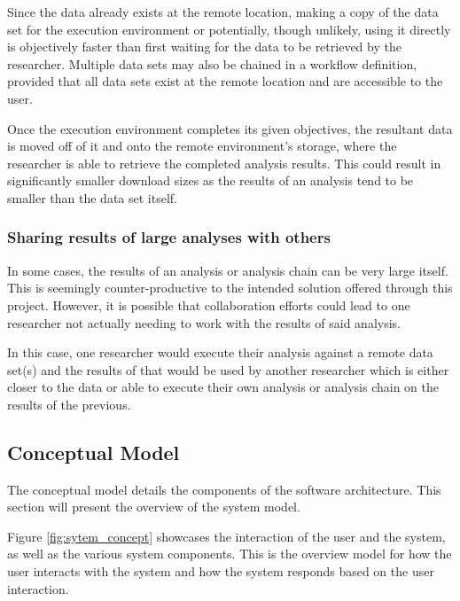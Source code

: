 Since the data already exists at the remote location, making a copy of the data set for the execution environment  or potentially, though unlikely, using it directly is objectively faster than first waiting for the data to be retrieved by the researcher. Multiple data sets may also be chained in a workflow definition, provided that all data sets exist at the remote location and are accessible to the user.

Once the execution environment completes its given objectives, the resultant data is moved off of it and onto the remote environment's storage, where the researcher is able to retrieve the completed analysis results. This could result in significantly smaller download sizes as the results of an analysis tend to be smaller than the data set itself.

\subsubsection{Sharing results of large analyses with others}

In some cases, the results of an analysis or analysis chain can be very large itself. This is seemingly counter-productive to the intended solution offered through this project. However, it is possible that collaboration efforts could lead to one researcher not actually needing to work with the results of said analysis.

In this case, one researcher would execute their analysis against a remote data set(s) and the results of that would be used by another researcher which is either closer to the data or able to execute their own analysis or analysis chain on the results of the previous.

\subsection{Conceptual Model}

The conceptual model details the components of the software architecture. This section will present the overview of the system model.

Figure \ref{fig:sytem_concept} showcases the interaction of the user and the system, as well as the various system components. This is the overview model for how the user interacts with the system and how the system responds based on the user interaction.

